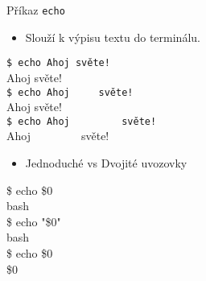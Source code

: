 \documentclass{beamer}
\begin{document}
\begin{frame}[fragile]{Příkaz \texttt{echo}}
	\begin{itemize}
		\item Slouží k výpisu textu do terminálu.
	\end{itemize}
	
	\hspace{3em}\texttt{\$ echo Ahoj světe!} \\
	\hspace{3em}Ahoj světe! \\[0.5em]
	
	\hspace{3em}\texttt{\$ echo Ahoj\ \ \ \ \ světe!} \\
	\hspace{3em}Ahoj    světe! \\[0.5em]
	
	\hspace{3em}\texttt{\$ echo \textquotesingle Ahoj\ \ \ \ \ \ \ \ \ světe!\textquotesingle} \\
	\hspace{3em}Ahoj\ \ \ \ \ \ \ \ \ světe!

	\begin{itemize}
		\item Jednoduché vs Dvojité uvozovky
	\end{itemize}

	\hspace{3em}\$ echo \$0 \\
	\hspace{3em}bash \\[0.5em]
	
	\hspace{3em}\$ echo "\$0" \\
	\hspace{3em}bash \\[0.5em]
	
	\hspace{3em}\$ echo \textquotesingle \$0\textquotesingle \\
	\hspace{3em}\$0 \\[0.5em]
\end{frame}
\end{document}
